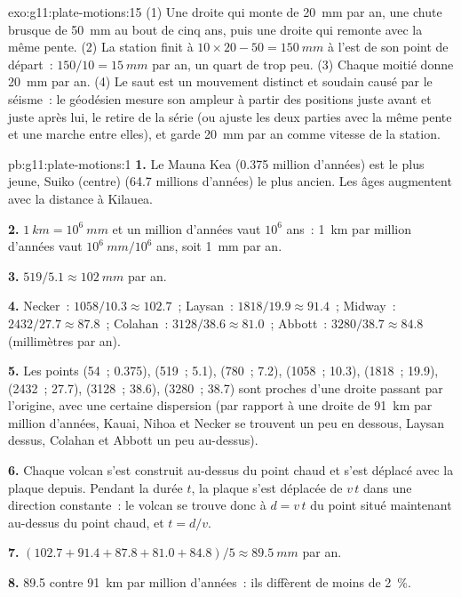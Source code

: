 \begin{solution}{exo:g11:plate-motions:15}
(1) Une droite qui monte de \qty{20}{mm} par an, une chute brusque de
\qty{50}{mm} au bout de cinq ans, puis une droite qui remonte avec la même
pente. (2) La station finit à $10 \times 20 - 50 = \qty{150}{mm}$ à l'est de
son point de départ~: $150/10 = \qty{15}{mm}$ par an, un quart de trop peu.
(3) Chaque moitié donne \qty{20}{mm} par an. (4) Le saut est un mouvement
distinct et soudain causé par le séisme~: le géodésien mesure son ampleur à
partir des positions juste avant et juste après lui, le retire de la série
(ou ajuste les deux parties avec la même pente et une marche entre elles),
et garde \qty{20}{mm} par an comme vitesse de la station.
\end{solution}

\begin{solution}{pb:g11:plate-motions:1}
\textbf{1.} Le Mauna Kea (\num{0.375} million d'années) est le plus jeune,
Suiko (centre) (\num{64.7} millions d'années) le plus ancien. Les âges
augmentent avec la distance à Kilauea.

\textbf{2.} $\qty{1}{km} = 10^6~\unit{mm}$ et un million d'années vaut $10^6$
ans~: \qty{1}{km} par million d'années vaut $10^6~\unit{mm}/10^6$ ans, soit
\qty{1}{mm} par an.

\textbf{3.} $519/5.1 \approx \qty{102}{mm}$ par an.

\textbf{4.} Necker~: $1058/10.3 \approx 102.7$~; Laysan~: $1818/19.9 \approx
91.4$~; Midway~: $2432/27.7 \approx 87.8$~; Colahan~: $3128/38.6 \approx 81.0$~;
Abbott~: $3280/38.7 \approx 84.8$ (millimètres par an).

\textbf{5.} Les points (54~; 0.375), (519~; 5.1), (780~; 7.2), (1058~; 10.3),
(1818~; 19.9), (2432~; 27.7), (3128~; 38.6), (3280~; 38.7) sont proches d'une
droite passant par l'origine, avec une certaine dispersion (par rapport à
une droite de \qty{91}{km} par million d'années, Kauai, Nihoa et Necker se
trouvent un peu en dessous, Laysan dessus, Colahan et Abbott un peu
au-dessus).

\textbf{6.} Chaque volcan s'est construit au-dessus du point chaud et s'est
déplacé avec la plaque depuis. Pendant la durée $t$, la plaque s'est
déplacée de $v\,t$ dans une direction constante~: le volcan se trouve donc à
$d = v\,t$ du point situé maintenant au-dessus du point chaud, et $t = d/v$.

\textbf{7.} $(102.7 + 91.4 + 87.8 + 81.0 + 84.8)/5 \approx \qty{89.5}{mm}$
par an.

\textbf{8.} 89.5 contre \qty{91}{km} par million d'années~: ils diffèrent de
moins de \qty{2}{\percent}.


\end{solution}
